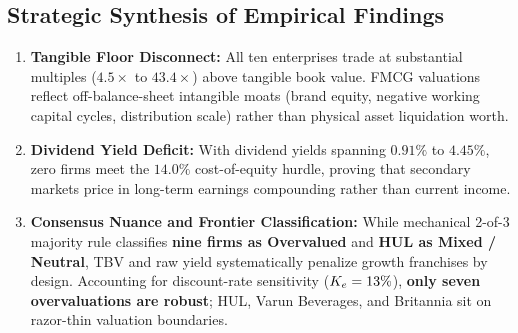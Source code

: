 \subsection{Strategic Synthesis of Empirical Findings}
\begin{enumerate}[label=\textbf{\arabic*.}, topsep=1pt, itemsep=0.5pt, parsep=0pt]
    \item \textbf{Tangible Floor Disconnect:} All ten enterprises trade at substantial multiples ($4.5\times$ to $43.4\times$) above tangible book value. FMCG valuations reflect off-balance-sheet intangible moats (brand equity, negative working capital cycles, distribution scale) rather than physical asset liquidation worth.
    \item \textbf{Dividend Yield Deficit:} With dividend yields spanning $0.91\%$ to $4.45\%$, zero firms meet the $14.0\%$ cost-of-equity hurdle, proving that secondary markets price in long-term earnings compounding rather than current income.
    \item \textbf{Consensus Nuance and Frontier Classification:} While mechanical 2-of-3 majority rule classifies \textbf{nine firms as Overvalued} and \textbf{HUL as Mixed / Neutral}, TBV and raw yield systematically penalize growth franchises by design. Accounting for discount-rate sensitivity ($K_e = 13\%$), \textbf{only seven overvaluations are robust}; HUL, Varun Beverages, and Britannia sit on razor-thin valuation boundaries.
\end{enumerate}

